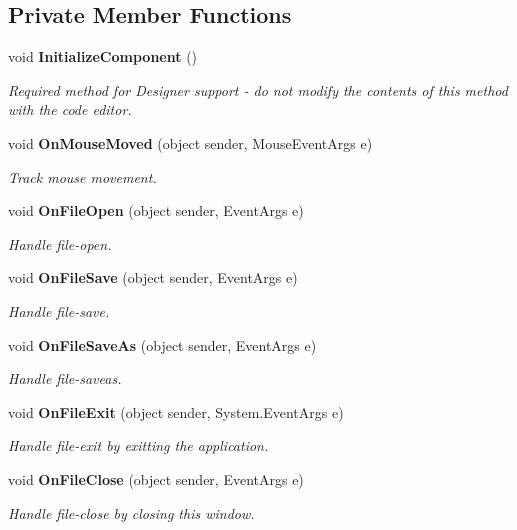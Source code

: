 \subsection*{Private Member Functions}
\begin{CompactItemize}
\item 
void {\bf Initialize\-Component} ()
\begin{CompactList}\small\item\em Required method for Designer support - do not modify the contents of this method with the code editor. \item\end{CompactList}\item 
void {\bf On\-Mouse\-Moved} (object sender, Mouse\-Event\-Args e)
\begin{CompactList}\small\item\em Track mouse movement. \item\end{CompactList}\item 
void {\bf On\-File\-Open} (object sender, Event\-Args e)
\begin{CompactList}\small\item\em Handle file-open. \item\end{CompactList}\item 
void {\bf On\-File\-Save} (object sender, Event\-Args e)
\begin{CompactList}\small\item\em Handle file-save. \item\end{CompactList}\item 
void {\bf On\-File\-Save\-As} (object sender, Event\-Args e)
\begin{CompactList}\small\item\em Handle file-saveas. \item\end{CompactList}\item 
void {\bf On\-File\-Exit} (object sender, System.Event\-Args e)
\begin{CompactList}\small\item\em Handle file-exit by exitting the application. \item\end{CompactList}\item 
void {\bf On\-File\-Close} (object sender, Event\-Args e)
\begin{CompactList}\small\item\em Handle file-close by closing this window. \item\end{CompactList}\item 

\end{CompactItemize}
